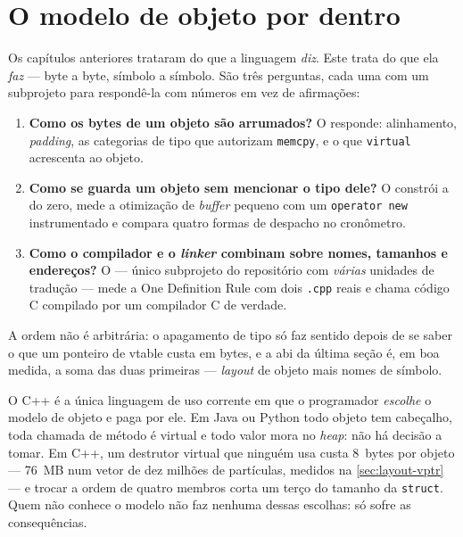 
\section{O modelo de objeto por dentro}
\label{sec:modelo-objeto}

Os capítulos anteriores trataram do que a linguagem \emph{diz}. Este trata do
que ela \emph{faz} --- byte a byte, símbolo a símbolo. São três perguntas, cada
uma com um subprojeto para respondê-la com números em vez de afirmações:

\begin{enumerate}
    \item \textbf{Como os bytes de um objeto são arrumados?} O
           responde: alinhamento, \emph{padding}, as categorias
          de tipo que autorizam \texttt{memcpy}, e o que \texttt{virtual}
          acrescenta ao objeto.
    \item \textbf{Como se guarda um objeto sem mencionar o tipo dele?} O
           constrói a  do zero,
          mede a otimização de \emph{buffer} pequeno com um \texttt{operator
          new} instrumentado e compara quatro formas de despacho no cronômetro.
    \item \textbf{Como o compilador e o \emph{linker} combinam sobre nomes,
          tamanhos e endereços?} O  --- único subprojeto do
          repositório com \emph{várias} unidades de tradução --- mede a One
          Definition Rule com dois \texttt{.cpp} reais e chama código C
          compilado por um compilador C de verdade.
\end{enumerate}

A ordem não é arbitrária: o apagamento de tipo só faz sentido depois de se saber
o que um ponteiro de \gls{vtable} custa em bytes, e a \gls{abi} da última seção
é, em boa medida, a soma das duas primeiras --- \emph{layout} de objeto mais
nomes de símbolo.

\begin{porque}
O C++ é a única linguagem de uso corrente em que o programador \emph{escolhe} o
modelo de objeto e paga por ele. Em Java ou Python todo objeto tem cabeçalho,
toda chamada de método é virtual e todo valor mora no \emph{heap}: não há
decisão a tomar. Em C++, um destrutor virtual que ninguém usa custa 8~bytes por
objeto --- 76~MB num vetor de dez milhões de partículas, medidos na
\cref{sec:layout-vptr} --- e trocar a ordem de quatro membros corta um terço do
tamanho da \texttt{struct}. Quem não conhece o modelo não faz nenhuma dessas
escolhas: só sofre as consequências.
\end{porque}

